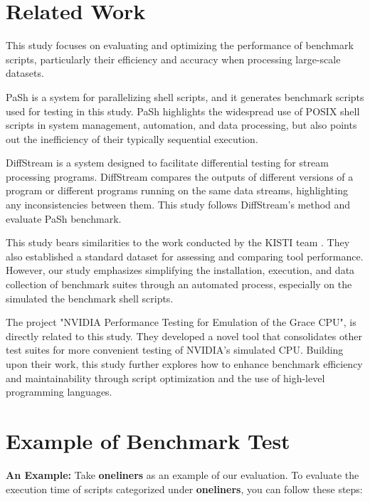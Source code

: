 \documentclass[sigplan, screen, 10pt]{acmart}
\begin{document}
\section{Related Work}
\label{related}
This study focuses on evaluating and optimizing the performance of benchmark scripts\cite{binpashbenchmark}, particularly their efficiency and accuracy when processing large-scale datasets.\par
PaSh\cite{vasilakis2021pash} is a system for parallelizing shell scripts, and it generates benchmark scripts used for testing in this study.
PaSh highlights the widespread use of POSIX shell scripts in system management, automation, and data processing, but also points out the inefficiency of their typically sequential execution.\par
DiffStream\cite{kallas2020diffstream} is a system designed to facilitate differential testing for stream processing programs.
DiffStream compares the outputs of different versions of a program or different programs running on the same data streams, highlighting any inconsistencies between them.
This study follows DiffStream's method and evaluate PaSh benchmark.\par
This study bears similarities to the work conducted by the KISTI team \cite{kim2015webshark}.   
They also established a standard dataset for assessing and comparing tool performance.
However, our study emphasizes simplifying the installation, execution, and data collection of benchmark suites through an automated process, especially on the simulated the benchmark shell scripts.\par
The project "NVIDIA Performance Testing for Emulation of the Grace CPU"\cite{fan2021nvidia}, is directly related to this study.
They developed a novel tool that consolidates other test suites for more convenient testing of NVIDIA's simulated CPU. 
Building upon their work, this study further explores how to enhance benchmark efficiency and maintainability through script optimization and the use of high-level programming languages.\newline

\section{Example of Benchmark Test}
\label{ex}

\textbf{An Example:}
Take \textbf{oneliners} as an example of our evaluation. To evaluate the execution time of scripts categorized under \textbf{oneliners}, you can follow these steps:
\end{document}
